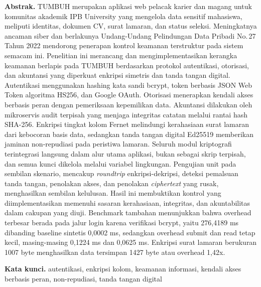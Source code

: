 \documentclass[12pt,a4paper]{article}
\begin{document}
\noindent\textbf{Abstrak.} TUMBUH merupakan aplikasi web pelacak
karier dan magang untuk komunitas akademik IPB University yang
mengelola data sensitif mahasiswa, meliputi identitas, dokumen CV,
surat lamaran, dan status seleksi. Meningkatnya ancaman siber dan
berlakunya Undang-Undang Pelindungan Data Pribadi No.\,27 Tahun 2022
mendorong penerapan kontrol keamanan terstruktur pada sistem semacam
ini. Penelitian ini merancang dan mengimplementasikan kerangka
keamanan berlapis pada TUMBUH berdasarkan protokol autentikasi,
otorisasi, dan akuntansi yang diperkuat enkripsi simetris dan tanda
tangan digital. Autentikasi menggunakan hashing kata sandi bcrypt,
token berbasis JSON Web Token algoritma HS256, dan Google OAuth.
Otorisasi menerapkan kendali akses berbasis peran dengan pemeriksaan
kepemilikan data. Akuntansi dilakukan oleh mikroservis audit terpisah
yang menjaga integritas catatan melalui rantai hash SHA-256. Enkripsi
tingkat kolom Fernet melindungi kerahasiaan surat lamaran dari
kebocoran basis data, sedangkan tanda tangan digital Ed25519
memberikan jaminan non-repudiasi pada peristiwa lamaran. Seluruh modul
kriptografi terintegrasi langsung dalam alur utama aplikasi, bukan
sebagai skrip terpisah, dan semua kunci dikelola melalui variabel
lingkungan. Pengujian unit pada sembilan skenario, mencakup
\textit{roundtrip} enkripsi-dekripsi, deteksi pemalsuan tanda tangan,
penolakan akses, dan penolakan \textit{ciphertext} yang rusak,
menghasilkan sembilan kelulusan. Hasil ini membuktikan kontrol yang
diimplementasikan memenuhi sasaran kerahasiaan, integritas, dan
akuntabilitas dalam cakupan yang diuji. Benchmark tambahan menunjukkan
bahwa overhead terbesar berada pada jalur login karena verifikasi
bcrypt, yaitu 276,4189 ms dibanding baseline sintetis 0,0002 ms,
sedangkan overhead submit dan read tetap kecil, masing-masing 0,1224
ms dan 0,0625 ms. Enkripsi surat lamaran berukuran 1007 byte
menghasilkan data tersimpan 1427 byte atau overhead 1,42x.

\vspace{4pt}
\noindent\textbf{Kata kunci.} autentikasi, enkripsi kolom, keamanan
informasi, kendali akses berbasis peran, non-repudiasi, tanda tangan
digital

\vspace{6pt}
\end{document}
